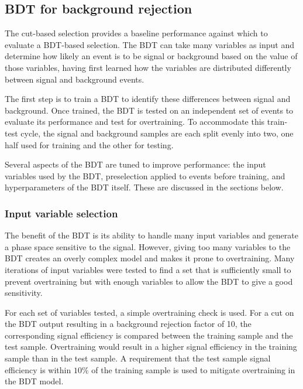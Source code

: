 \subsection{\acs{BDT} for background rejection}

The cut-based selection provides a baseline performance against which to
evaluate a \ac{BDT}-based selection. The \ac{BDT} can take many variables as
input and determine how likely an event is to be signal or background based on
the value of those variables, having first learned how the variables are
distributed differently between signal and background events.

The first step is to train a \ac{BDT} to identify these differences between
signal and background. Once trained, the \ac{BDT} is tested on an independent
set of events to evaluate its performance and test for overtraining.
To accommodate this train-test cycle, the signal and background samples are each
split evenly into two, one half used for training and the other for testing.

Several aspects of the \ac{BDT} are tuned to improve performance: the input
variables used by the \ac{BDT}, preselection applied to events before training,
and hyperparameters of the \ac{BDT} itself. These are discussed in the sections
below.

\subsubsection{Input variable selection}
\label{sec:vzy-bdt-variables}

The benefit of the \ac{BDT} is its ability to handle many input variables and
generate a phase space sensitive to the signal. However, giving too many
variables to the \ac{BDT} creates an overly complex model and makes it prone to
overtraining. Many iterations of input variables were tested to find a set that
is sufficiently small to prevent overtraining but with enough variables to allow
the \ac{BDT} to give a good sensitivity.

For each set of variables tested, a simple overtraining check is used. For a
cut on the \ac{BDT} output resulting in a background rejection factor of 10, the
corresponding signal efficiency is compared between the training sample and the
test sample. Overtraining would result in a higher signal efficiency in the
training sample than in the test sample. A requirement that the test sample
signal efficiency is within $10\%$ of the training sample is used to mitigate
overtraining in the \ac{BDT} model.

